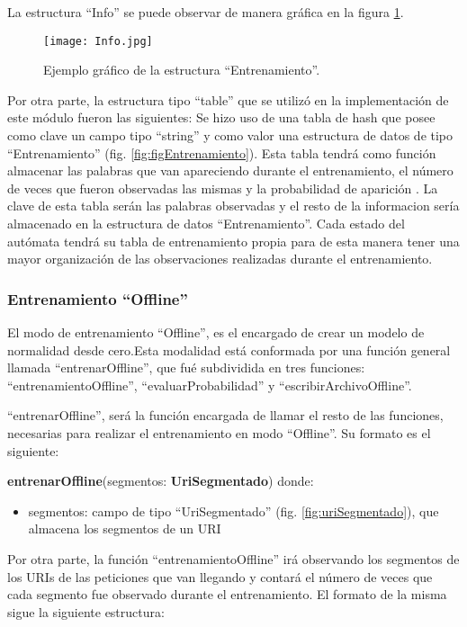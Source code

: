 La estructura ``Info'' se puede observar de manera gráfica en la figura
\ref{fig:figInfo}.

\begin{figure}[tb]
\begin{center}
\texttt{[image: Info.jpg]}
\caption{Ejemplo gráfico de la estructura ``Entrenamiento''.}
\label{fig:figInfo}
\end{center}
\end{figure}

Por otra parte, la estructura tipo ``table'' que se utilizó en la implementación de este módulo fueron las siguientes:
Se hizo uso de una tabla de hash que posee como clave un campo tipo
``string'' y como valor una estructura de datos de tipo ``Entrenamiento''
(fig. \ref{fig:figEntrenamiento}). Esta tabla tendrá como función almacenar las palabras que van apareciendo durante el entrenamiento, el número de veces que fueron observadas las mismas y la probabilidad de aparición . La clave de esta tabla serán las palabras observadas y el resto de la informacion sería almacenado en la estructura de datos ``Entrenamiento''.
Cada estado del autómata tendrá su tabla de entrenamiento propia para
de esta manera tener una mayor organización de las observaciones realizadas durante el entrenamiento.

\subsubsection{Entrenamiento ``Offline''}

El modo de entrenamiento ``Offline'', es el encargado de crear un modelo de normalidad desde cero.Esta modalidad está conformada por una
función general llamada ``entrenarOffline'', que fué subdividida en tres funciones: ``entrenamientoOffline'',
``evaluarProbabilidad'' y ``escribirArchivoOffline''.

``entrenarOffline'', será la función encargada de llamar el resto de las
funciones, necesarias para realizar el entrenamiento en modo ``Offline''. Su
formato es el siguiente:

\textbf{entrenarOffline}(segmentos: \textbf{UriSegmentado})
donde:

\begin{itemize}
\item segmentos: campo de tipo ``UriSegmentado'' (fig. \ref{fig:uriSegmentado}), que almacena los segmentos de un URI
\end{itemize}

Por otra parte, la función ``entrenamientoOffline'' irá observando los segmentos de los URIs de las peticiones que van llegando y contará el número de veces que cada segmento fue observado durante el entrenamiento. El formato de la misma sigue la siguiente estructura:

